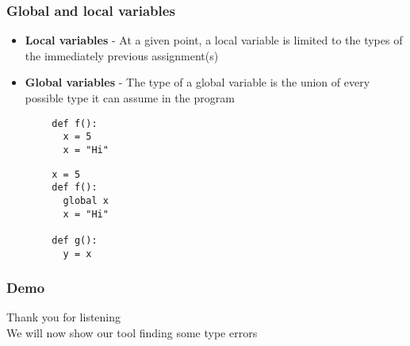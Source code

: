 \documentclass{beamer}
\begin{document}
\begin{frame}[fragile]
    \frametitle{Global and local variables}
    \begin{itemize}
    \item \textbf{Local variables} - At a given point, a local variable is limited to the types of the immediately previous assignment(s)
    		\item \textbf{Global variables} - The type of a global variable is the union of every possible type it can assume in the program
    \end{itemize}
    
    \begin{lstlisting}
        def f():
          x = 5
          x = "Hi"
    \end{lstlisting}
    \begin{lstlisting}
        x = 5
        def f():
          global x
          x = "Hi"
          
        def g():
          y = x
    \end{lstlisting}
\end{frame}
  
  
  \begin{frame}
    \frametitle{Demo}
    Thank you for listening \\
    We will now show our tool finding some type errors
  \end{frame}
  
  
  
  
  
  
  
  
  
\end{document}
